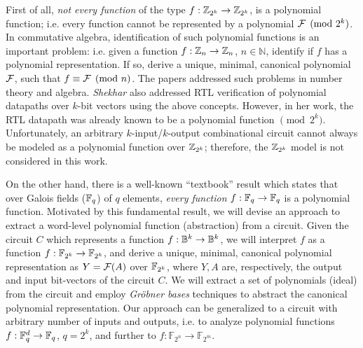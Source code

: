 First of all, {\it not every
  function} of the type $f: {\mathbb{Z}}_{2^k} \rightarrow {\mathbb{Z}}_{2^k}$, is a
polynomial function; i.e. every function cannot be represented by a
polynomial ${\mathcal{F}} \pmod{ 2^k}$.  In commutative algebra, identification of
such polynomial functions is an important problem: i.e.  given a function
$f: {\mathbb{Z}}_n \rightarrow {\mathbb{Z}}_n$, $n \in {\mathbb{N}}$, identify if $f$ has
a polynomial representation. If so, derive a unique,
minimal, canonical polynomial ${\mathcal{F}}$, such that $f \equiv  {\mathcal{F}} \pmod{
  n}$. 
The papers
\cite{singmaster} \cite{chen_95} \cite{chen_96} addressed such
problems in number theory and algebra. {\it
 Shekhar} \cite{shekhar:phd} also addressed RTL verification of
polynomial datapaths over $k$-bit vectors using the above
concepts. However, in her work, the RTL datapath was already known to
be a polynomial function $\pmod{ 2^k}$. Unfortunately, an arbitrary
$k$-input/$k$-output combinational circuit cannot always be modeled as
a polynomial function over ${\mathbb{Z}}_{2^k}$; therefore, the ${\mathbb{Z}}_{2^k}$ model
is not considered in this work. 

On the other hand, there is a well-known ``textbook'' result
\cite{ff:1997} which states that over Galois fields (${\mathbb{F}}_{q}$) of $q$
elements, {\it every function} $f: {\mathbb{F}}_{q} \rightarrow {\mathbb{F}}_{q}$ is a
polynomial function. 
Motivated by this fundamental result, we will devise an approach
to extract a word-level polynomial function (abstraction) from a
circuit. Given the circuit $C$ which represents a function $f:
{\mathbb{B}}^k \rightarrow {\mathbb{B}}^k$, we will interpret $f$ as a function $f: {\mathbb{F}}_{2^k}
\rightarrow {\mathbb{F}}_{2^k}$, and derive a unique, minimal, canonical polynomial
representation as $Y = {\mathcal{F}}(A)$ over ${\mathbb{F}}_{2^k}$, where $Y, A$ are,
respectively, the output and input bit-vectors of the circuit
$C$. 
We will extract a set of polynomials (ideal) from the circuit and employ
{\it Gr\"obner bases} techniques to abstract the canonical polynomial
representation. Our approach can be generalized to a circuit with
arbitrary number of inputs and outputs, i.e. to analyze polynomial
functions $f: {\mathbb{F}}_{q}^d \rightarrow {\mathbb{F}}_{q}$, $q = 2^k$, and further to $f:
{\mathbb{F}}_{2^n} \rightarrow {\mathbb{F}}_{2^m}$. 

